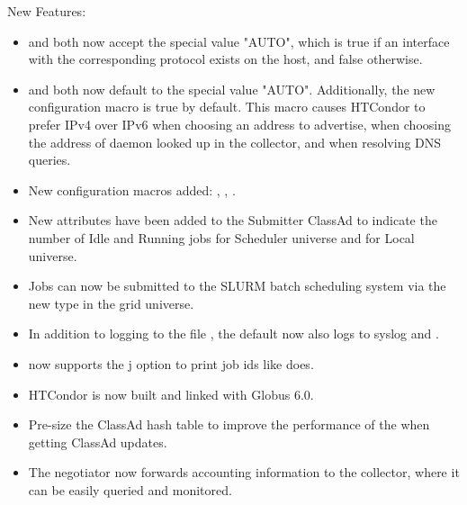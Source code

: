 \noindent New Features:

\begin{itemize}

\item {} and  both now accept
the special value "AUTO", which is true if an interface with the corresponding
protocol exists on the host, and false otherwise.

\item {} and  both now default
to the special value "AUTO".  Additionally, the new configuration macro
 is true by default.  This macro causes HTCondor to
prefer IPv4 over IPv6 when choosing an address to advertise, when choosing
the address of daemon looked up in the collector, and when resolving DNS
queries.

\item New configuration macros added: ,
, .

\item New attributes have been added to the Submitter ClassAd to indicate
the number of Idle and Running jobs for Scheduler universe and for Local
universe.

\item Jobs can now be submitted to the SLURM batch scheduling system via
the new  type in the grid universe.

\item In addition to logging to the file ,
the default  now also logs to
syslog and .

\item {}  now supports the j option to print
job ids like  does.

\item HTCondor is now built and linked with Globus 6.0.

\item Pre-size the ClassAd hash table to improve the performance of the
 when getting ClassAd updates.

\item The negotiator now forwards accounting information to the collector,
where it can be easily queried and monitored.

\end{itemize}

